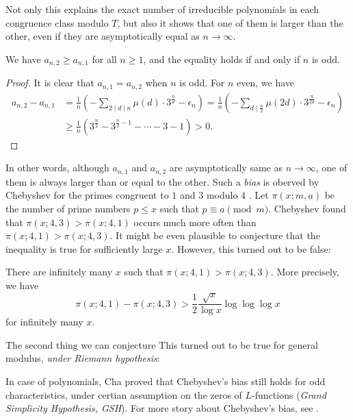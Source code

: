 Not only this explains the exact number of irreducible polynomials in each congruence class modulo $T$, but also it shows that one of them is larger than the other, even if they are asymptotically equal as $n \to \infty$.
\begin{corollary}
    We have $a_{n,2} \ge a_{n,1}$ for all $n \ge 1$, and the equality holds if and only if $n$ is odd.
\end{corollary}
\begin{proof}
    It is clear that $a_{n,1} = a_{n,2}$ when $n$ is odd.
    For $n$ even, we have
    \begin{align*}
    a_{n,2} - a_{n,1} &= \frac{1}{n} \left(- \sum_{2 \mid d \mid n} \mu(d)\cdot 3^{\frac{n}{d}} - \epsilon_n\right) = \frac{1}{n} \left(-\sum_{d \mid \frac{n}{2}} \mu(2d) \cdot 3^{\frac{n}{2d}} - \epsilon_n\right) \\
    &\ge \frac{1}{n} \left(3^{\frac{n}{2}} - 3^{\frac{n}{2} - 1} - \cdots - 3 - 1\right) > 0.
    \end{align*}
\end{proof}

In other words, although $a_{n,1}$ and $a_{n,2}$ are asymptotically same as $n \to \infty$, one of them is always larger than or equal to the other.
Such a \emph{bias} is oberved by Chebyshev for the primes congruent to $1$ and $3$ modulo $4$ \cite{chebyshev1853lettre}.
Let $\pi(x;m,a)$ be the number of prime numbers $p \le x$ such that $p \equiv a \pmod{m}$.
Chebyshev found that $\pi(x;4, 3) > \pi(x;4,1)$ occurs much more often than $\pi(x;4,1) > \pi(x;4,3)$.
It might be even plausible to conjecture that the inequality is true for sufficiently large $x$.
However, this turned out to be false:
\begin{theorem}
    There are infinitely many $x$ such that $\pi(x;4,1) > \pi(x;4,3)$.
    More precisely, we have
    \[
    \pi(x;4,1) - \pi(x;4,3) > \frac{1}{2} \frac{\sqrt{x}}{\log x} \log \log \log x
    \]
    for infinitely many $x$.
\end{theorem}

The second thing we can conjecture
This turned out to be true for general modulus, \emph{under Riemann hypothesis}:
\begin{theorem}
    
\end{theorem}

In case of polynomials, Cha \cite{cha2008chebyshev} proved that Chebyshev's bias still holds for odd characteristics, under certian assumption on the zeros of $L$-functions (\emph{Grand Simplicity Hypothesis, GSH}).
For more story about Chebyshev's bias, see \cite{granville2006prime}.

